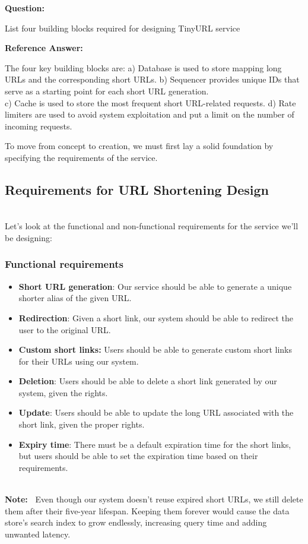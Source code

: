 \textbf{Question:}

List four building blocks required for designing TinyURL service

\textbf{Reference Answer:}

The four key building blocks are: a) Database is used to store mapping long URLs and the corresponding short URLs. b) Sequencer provides unique IDs that serve as a starting point for each short URL generation.\\
c) Cache is used to store the most frequent short URL-related requests. d) Rate limiters are used to avoid system exploitation and put a limit on the number of incoming requests.

To move from concept to creation, we must first lay a solid foundation by specifying the requirements of the service.

\subsection{Requirements for URL Shortening Design}\label{AGJuvJeZb_WVtn7aW83e9}
\\
Let's look at the functional and non-functional requirements for the service we'll be designing:

\subsubsection{Functional requirements}\label{vz4iMmiQt7BPdAo8QwXJA}

\begin{itemize}
\item
\protect{}\label{_FR4Nw6V2Mgptc0fiMgcp}
\textbf{Short URL generation}: Our service should be able to generate a unique shorter alias of the given URL.
\item
\protect{}\label{QyxlYu7__9jsQSmOAR_i6}
\textbf{Redirection}: Given a short link, our system should be able to redirect the user to the original URL.
\item
\protect{}\label{7DllASCXF5Oh8wI17UJ4Z}
\textbf{Custom short links:} Users should be able to generate custom short links for their URLs using our system.
\item
\protect{}\label{K11OBEkbsTkJV9ZDZjCrs}
\textbf{Deletion}: Users should be able to delete a short link generated by our system, given the rights.
\item
\protect{}\label{782nAJ-m8Ni1PI6hMHrGp}
\textbf{Update}: Users should be able to update the long URL associated with the short link, given the proper rights.
\item
\protect{}\label{qIeb5ms34YSL_k35OF8s9}
\textbf{Expiry time}: There must be a default expiration time for the short links, but users should be able to set the expiration time based on their requirements.
\end{itemize}
\\
\textbf{Note:~} Even though our system doesn't reuse expired short URLs, we still delete them after their five-year lifespan. Keeping them forever would cause the data store's search index to grow endlessly, increasing query time and adding unwanted latency.

